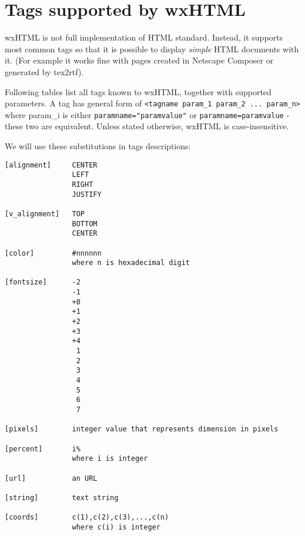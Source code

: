 \section{Tags supported by wxHTML}\label{htmltagssupported}

wxHTML is not full implementation of HTML standard. Instead, it supports most common tags so that it 
is possible to display {\it simple} HTML documents with it. (For example it works fine with pages created
in Netscape Composer or generated by tex2rtf).

Following tables list all tags known to wxHTML, together with supported parameters.
A tag has general form of {\tt <tagname param\_1 param\_2 ... param\_n>} where param\_i is
either {\tt paramname="paramvalue"} or {\tt paramname=paramvalue} - these two are equivalent. Unless stated 
otherwise, wxHTML is case-insensitive.



We will use these substitutions in tags descriptions:

\begin{verbatim}
[alignment]     CENTER
                LEFT
                RIGHT
                JUSTIFY

[v_alignment]   TOP
                BOTTOM
                CENTER
                
[color]         #nnnnnn
                where n is hexadecimal digit

[fontsize]      -2
                -1
                +0
                +1
                +2
                +3
                +4
                 1
                 2
                 3
                 4
                 5
                 6
                 7

[pixels]        integer value that represents dimension in pixels

[percent]       i% 
                where i is integer

[url]           an URL 

[string]        text string

[coords]        c(1),c(2),c(3),...,c(n)
                where c(i) is integer

\end{verbatim}



